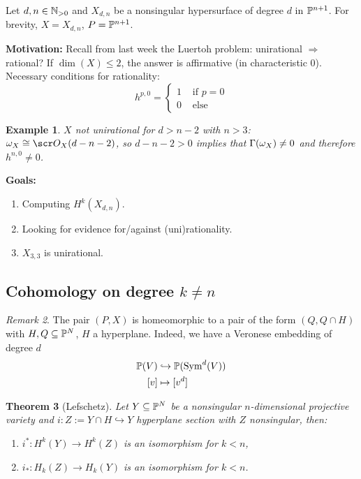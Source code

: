 \documentclass[A4paper, british, reqno]{amsart}
\theoremstyle{darkgreentheorem}
\newtheorem{thm}{Theorem}[section]
\theoremstyle{darkbluedefinition}
\theoremstyle{darkredexample}
\newtheorem{exa}[thm]{Example}
\theoremstyle{remark}
\newtheorem{rem}[thm]{Remark}
\newcommand{\1}{\mathbbm{1}}
\newcommand{\mono}{\hookrightarrow}
\begin{document}
Let $d,n\in\N_{>0}$ and $X_{d,n}$ be a nonsingular hypersurface of degree $d$ in $\P^{n+1}$.
For brevity, $X=X_{d,n}$, $P=\P^{n+1}$.

\textbf{Motivation:}
Recall from last week the Luertoh problem: unirational $\Rightarrow $ rational?
If $\dim(X)\leqslant 2$, the answer is affirmative (in characteristic $0$).
Necessary conditions for rationality:
\[ h^{p,0}=\begin{cases}
    1 & \text{ if }p=0 \\
    0 & \text{ else }
\end{cases}\]

\begin{exa}
    $X$ not unirational for $d>n-2$ with $n>3$:
    $\w_{X}\cong \O_{X}(d-n-2)$, so $d-n-2>0$ implies that $\Gamma(\w_{X})\neq 0$ and therefore $h^{n,0}\neq 0$.
\end{exa}

\textbf{Goals:}
\begin{enumerate}
    \item Computing $H^{k}(X_{d,n})$.
    \item Looking for evidence for/against (uni)rationality.
    \item $X_{3,3}$ is unirational.
\end{enumerate}

\subsection{Cohomology on degree $k\neq n$}

\begin{rem}
    The pair $(P,X)$ is homeomorphic to a pair of the form $(Q,Q\cap H)$ with $H,Q\subseteq \P^{N}$, $H$ a hyperplane.
    Indeed, we have a Veronese embedding of degree $d$
    \begin{align*}
	\P(V) &\mono \P(\operatorname{Sym}^{d}(V)) \\
	[v] & \mapsto [v^{d}]
    \end{align*}
\end{rem}

\begin{thm}[Lefschetz]
    Let $Y\subseteq \P^{N}$ be a nonsingular $n$-dimensional projective variety and $i\colon Z:=Y\cap H\mono Y$ hyperplane section with $Z$ nonsingular, then:
    \begin{enumerate}
	\item $i^{*}\colon H^{k}(Y)\to H^{k}(Z)$ is an isomorphism for $k<n$,
	\item $i_{*}\colon H_{k}(Z)\to H_{k}(Y)$ is an isomorphism for $k<n$.
    \end{enumerate}
\end{thm}
\end{document}
